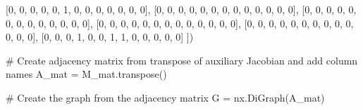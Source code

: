 \documentclass[
  letterpaper,
  DIV=11,
  numbers=noendperiod]{scrreprt}
\newenvironment{Shaded}{\begin{snugshade}}{\end{snugshade}}
\newcommand{\CommentTok}[1]{\textcolor[rgb]{0.37,0.37,0.37}{#1}}
\newcommand{\DecValTok}[1]{\textcolor[rgb]{0.68,0.00,0.00}{#1}}
\newcommand{\NormalTok}[1]{\textcolor[rgb]{0.00,0.23,0.31}{#1}}
\newcommand{\OperatorTok}[1]{\textcolor[rgb]{0.37,0.37,0.37}{#1}}
\begin{document}
\begin{tcolorbox}
\begin{Shaded}
\begin{Highlighting}[]
\NormalTok{    [}\DecValTok{0}\NormalTok{, }\DecValTok{0}\NormalTok{, }\DecValTok{0}\NormalTok{, }\DecValTok{0}\NormalTok{, }\DecValTok{0}\NormalTok{, }\DecValTok{1}\NormalTok{, }\DecValTok{0}\NormalTok{, }\DecValTok{0}\NormalTok{, }\DecValTok{0}\NormalTok{, }\DecValTok{0}\NormalTok{, }\DecValTok{0}\NormalTok{, }\DecValTok{0}\NormalTok{, }\DecValTok{0}\NormalTok{],}
\NormalTok{    [}\DecValTok{0}\NormalTok{, }\DecValTok{0}\NormalTok{, }\DecValTok{0}\NormalTok{, }\DecValTok{0}\NormalTok{, }\DecValTok{0}\NormalTok{, }\DecValTok{0}\NormalTok{, }\DecValTok{0}\NormalTok{, }\DecValTok{0}\NormalTok{, }\DecValTok{0}\NormalTok{, }\DecValTok{0}\NormalTok{, }\DecValTok{0}\NormalTok{, }\DecValTok{0}\NormalTok{, }\DecValTok{0}\NormalTok{],}
\NormalTok{    [}\DecValTok{0}\NormalTok{, }\DecValTok{0}\NormalTok{, }\DecValTok{0}\NormalTok{, }\DecValTok{0}\NormalTok{, }\DecValTok{0}\NormalTok{, }\DecValTok{0}\NormalTok{, }\DecValTok{0}\NormalTok{, }\DecValTok{0}\NormalTok{, }\DecValTok{0}\NormalTok{, }\DecValTok{0}\NormalTok{, }\DecValTok{0}\NormalTok{, }\DecValTok{0}\NormalTok{, }\DecValTok{0}\NormalTok{],}
\NormalTok{    [}\DecValTok{0}\NormalTok{, }\DecValTok{0}\NormalTok{, }\DecValTok{0}\NormalTok{, }\DecValTok{0}\NormalTok{, }\DecValTok{0}\NormalTok{, }\DecValTok{0}\NormalTok{, }\DecValTok{0}\NormalTok{, }\DecValTok{0}\NormalTok{, }\DecValTok{0}\NormalTok{, }\DecValTok{0}\NormalTok{, }\DecValTok{0}\NormalTok{, }\DecValTok{0}\NormalTok{, }\DecValTok{0}\NormalTok{],}
\NormalTok{    [}\DecValTok{0}\NormalTok{, }\DecValTok{0}\NormalTok{, }\DecValTok{0}\NormalTok{, }\DecValTok{0}\NormalTok{, }\DecValTok{0}\NormalTok{, }\DecValTok{0}\NormalTok{, }\DecValTok{0}\NormalTok{, }\DecValTok{0}\NormalTok{, }\DecValTok{0}\NormalTok{, }\DecValTok{0}\NormalTok{, }\DecValTok{0}\NormalTok{, }\DecValTok{0}\NormalTok{, }\DecValTok{0}\NormalTok{],}
\NormalTok{    [}\DecValTok{0}\NormalTok{, }\DecValTok{0}\NormalTok{, }\DecValTok{0}\NormalTok{, }\DecValTok{1}\NormalTok{, }\DecValTok{0}\NormalTok{, }\DecValTok{0}\NormalTok{, }\DecValTok{1}\NormalTok{, }\DecValTok{1}\NormalTok{, }\DecValTok{0}\NormalTok{, }\DecValTok{0}\NormalTok{, }\DecValTok{0}\NormalTok{, }\DecValTok{0}\NormalTok{, }\DecValTok{0}\NormalTok{]}
\NormalTok{])}

\CommentTok{\# Create adjacency matrix from transpose of auxiliary Jacobian and add column names}
\NormalTok{A\_mat }\OperatorTok{=}\NormalTok{ M\_mat.transpose()}

\CommentTok{\# Create the graph from the adjacency matrix}
\NormalTok{G }\OperatorTok{=}\NormalTok{ nx.DiGraph(A\_mat)}


\end{Highlighting}
\end{Shaded}
\end{tcolorbox}
\end{document}

